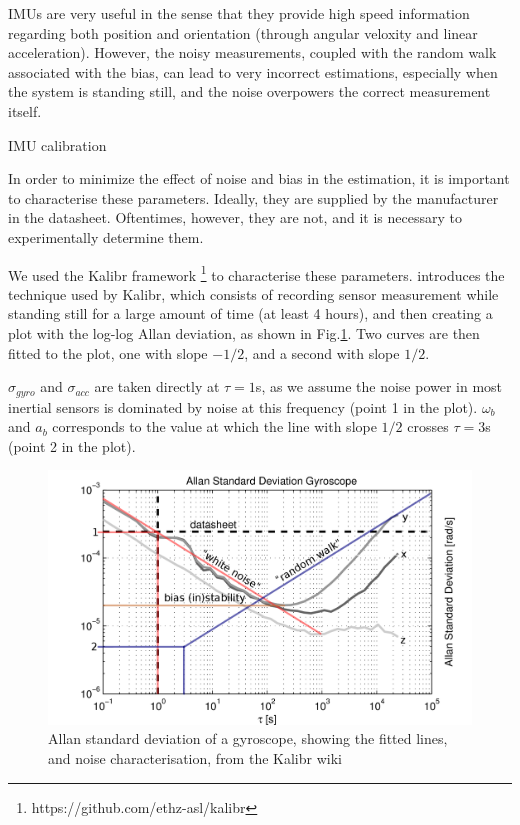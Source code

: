 \documentclass[10pt,twocolumn]{IEEEtran}
\begin{document}
IMUs are very useful in the sense that they provide high speed information regarding both position and orientation (through angular veloxity and linear acceleration). However, the noisy measurements, coupled with the random walk associated with the bias, can lead to very incorrect estimations, especially when the system is standing still, and the noise overpowers the correct measurement itself.

IMU calibration

In order to minimize the effect of noise and bias in the estimation, it is important to characterise these parameters. Ideally, they are supplied by the manufacturer in the datasheet. Oftentimes, however, they are not, and it is necessary to experimentally determine them.

We used the Kalibr framework \footnote{https://github.com/ethz-asl/kalibr} to characterise these parameters. \cite{board1998ieee} introduces the technique used by Kalibr, which consists of recording sensor measurement while standing still for a large amount of time (at least 4 hours), and then creating a plot with the log-log Allan deviation, as shown in Fig.\ref{fig:sec2_allan}. Two curves are then fitted to the plot, one with slope $-1/2$, and a second with slope $1/2$.

$\sigma_{gyro}$ and $\sigma_{acc}$ are taken directly at $\tau =1$s, as we assume the noise power in most inertial sensors is dominated by noise at this frequency (point 1 in the plot). $\omega_b$ and $a_b$ corresponds to the value at which the line with slope $1/2$ crosses $\tau = 3$s (point 2 in the plot).

\begin{figure}[ht]
    \centering
    \includegraphics[width = 1\linewidth]{allan.png}
    \caption{Allan standard deviation of a gyroscope, showing the fitted lines, and noise characterisation, from the Kalibr wiki}
    \label{fig:sec2_allan}
\end{figure}




\end{document}
